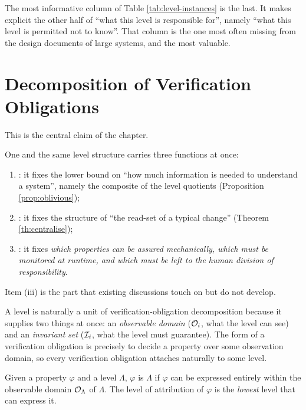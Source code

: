 The most informative column of Table \ref{tab:level-instances} is the last. It makes explicit
the other half of ``what this level is responsible for'', namely ``what this level is
permitted not to know''. That column is the one most often missing from the design documents
of large systems, and the most valuable.

\section{Decomposition of Verification Obligations}\label{sec:obligation-unit}

This is the central claim of the chapter.

\begin{principle}\label{pr:three-identities}
One and the same level structure carries three functions at once:
\begin{enumerate}[label=(\roman*)]
\item {}: it fixes the lower bound on ``how much information is
      needed to understand a system'', namely the composite of the level quotients
      (Proposition \ref{prop:oblivious});
\item {}: it fixes the structure of ``the read-set of a typical change''
      (Theorem \ref{th:centralise});
\item {}: it fixes \emph{which properties can be assured
      mechanically, which must be monitored at runtime, and which must be left to the human
      division of responsibility}.
\end{enumerate}
Item (iii) is the part that existing discussions touch on but do not develop.
\end{principle}

A level is naturally a unit of verification-obligation decomposition because it supplies two
things at once: an \emph{observable domain} ($\mathcal{O}_i$, what the level can see) and an
\emph{invariant set} ($\mathcal{I}_i$, what the level must guarantee). The form of a verification
obligation is precisely to decide a property over some observation domain, so every
verification obligation attaches naturally to some level.

\begin{definition}\label{def:obligation-assign}
Given a property $\varphi$ and a level $\Lambda$, $\varphi$ is  $\Lambda$
if $\varphi$ can be expressed entirely within the observable domain $\mathcal{O}_\Lambda$ of
$\Lambda$. The level of attribution of $\varphi$ is the \emph{lowest} level that can express
it.
\end{definition}

